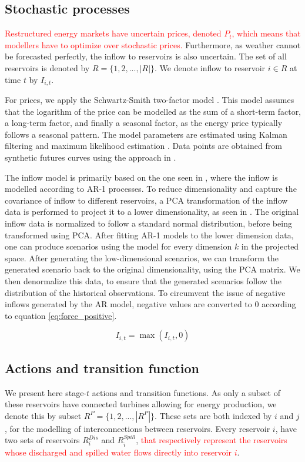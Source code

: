 




\subsection{Stochastic processes}
\textcolor{red}{Restructured energy markets have uncertain prices, denoted $P_t$, which means that modellers have to optimize over stochastic prices.} Furthermore, as weather cannot be forecasted perfectly, the inflow to reservoirs is also uncertain. The set of all reservoirs is denoted by $R=\{1,2,...,|R|\}$. We denote inflow to reservoir $i \in R$ at time $t$ by $I_{i,t}$.

For prices, we apply the Schwartz-Smith two-factor model \cite{schwartz2000a}. This model assumes that the logarithm of the price can be modelled as the sum of a short-term factor, a long-term factor, and finally a seasonal factor, as the energy price typically follows a seasonal pattern. The model parameters are estimated using Kalman filtering and maximum likelihood estimation \cite{goodwin2013a}. Data points are obtained from synthetic futures curves \cite{dietze} using the approach in \cite{benth2007a}.

The inflow model is primarily based on the one seen in \cite{gjelsvik2010a}, where the inflow is modelled according to AR-1 processes. To reduce dimensionality and capture the covariance of inflow to different reservoirs, a PCA transformation of the inflow data is performed to project it to a lower dimensionality, as seen in \cite{da_Costa2006}. The original inflow data is normalized to follow a standard normal distribution, before being transformed using PCA. After fitting AR-1 models to the lower dimension data, one can produce scenarios using the model for every dimension $k$ in the projected space. After generating the low-dimensional scenarios, we can transform the generated scenario back to the original dimensionality, using the PCA matrix. We then denormalize this data, to ensure that the generated scenarios follow the distribution of the historical observations. To circumvent the issue of negative inflows generated by the AR model, negative values are converted to 0 according to equation \eqref{eq:force_positive}. 


\begin{equation}
\label{eq:force_positive}
   I_{i,t} = \max(I_{i,t},0)
\end{equation}

\subsection{Actions and transition function}
We present here stage-$t$ actions and transition functions. As only a subset of these reservoirs have connected turbines allowing for energy production, we denote this by subset $R^P = \{1,2,...,|R^P|\}$. These sets are both indexed by $i$ and $j$, for the modelling of interconnections between reservoirs. Every reservoir $i$, have two sets of reservoirs $R^{Dis}_i$ and $R^{Spill}_i$, \textcolor{red}{that respectively represent the reservoirs whose discharged and spilled water flows directly into reservoir $i$}.

